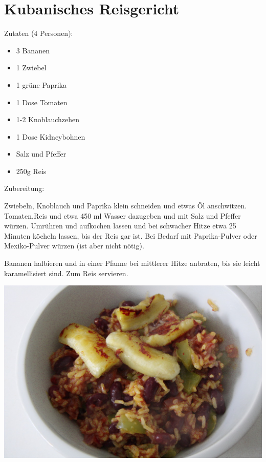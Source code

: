 \section{Kubanisches Reisgericht}
Zutaten (4 Personen):
\begin{itemize}
    \item 3 Bananen
    \item 1 Zwiebel
    \item 1 grüne Paprika
    \item 1 Dose Tomaten
    \item 1-2 Knoblauchzehen
    \item 1 Dose Kidneybohnen
    \item Salz und Pfeffer
    \item 250g Reis
\end{itemize}

\noindent Zubereitung:

\noindent Zwiebeln, Knoblauch und Paprika klein schneiden und etwas Öl
anschwitzen. Tomaten,Reis und etwa 450 ml Wasser dazugeben und mit Salz und
Pfeffer würzen. Umrühren und aufkochen lassen und bei schwacher Hitze etwa 25
Minuten köcheln lassen, bis der Reis gar ist. Bei Bedarf mit Paprika-Pulver
oder Mexiko-Pulver würzen (ist aber nicht nötig).

\noindent Bananen halbieren und in einer Pfanne bei mittlerer Hitze anbraten,
bis sie leicht karamellisiert sind. Zum Reis servieren.

\newpage
\mbox{}
\vfill
\begin{center}
    \includegraphics[width=\textwidth]{Kubanisches-Reisgericht/IMG_3600_small.jpg}
\end{center}
\vfill
\mbox{ }
\newpage
